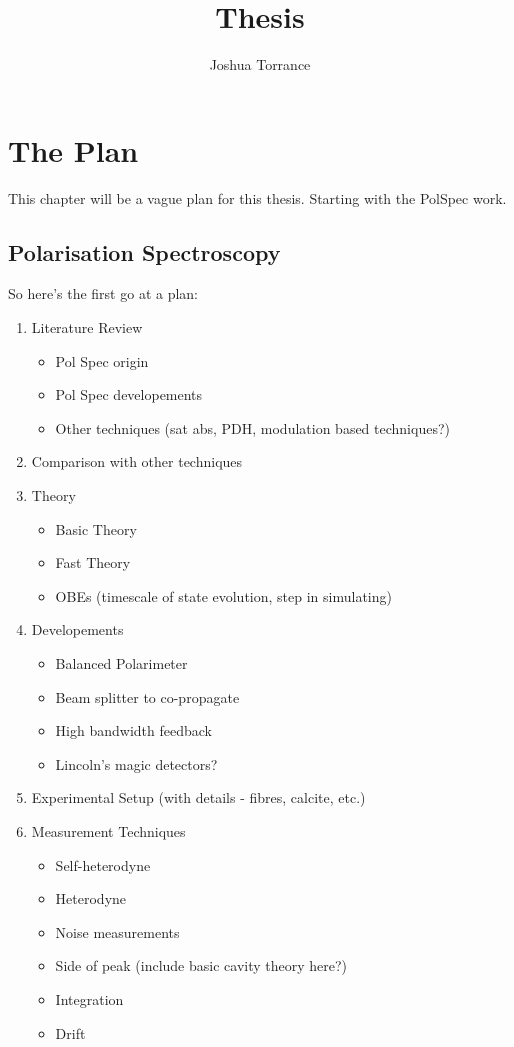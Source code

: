 \documentclass[11pt]{report}
\begin{document}
\title{Thesis}

\author{Joshua Torrance}

\maketitle

\chapter{The Plan}
This chapter will be a vague plan for this thesis. Starting with the PolSpec work.

\section{Polarisation Spectroscopy}
So here's the first go at a plan:
\begin{enumerate}
    \item Literature Review
    \begin{itemize}
        \item Pol Spec origin
        \item Pol Spec developements
        \item Other techniques (sat abs, PDH, modulation based techniques?)
    \end{itemize}
    \item Comparison with other techniques
    \item Theory
    \begin{itemize}
        \item Basic Theory
        \item Fast Theory
        \item OBEs (timescale of state evolution, step in simulating)
    \end{itemize}
    \item Developements
    \begin{itemize}
        \item Balanced Polarimeter
        \item Beam splitter to co-propagate
        \item High bandwidth feedback
        \item Lincoln's magic detectors?
    \end{itemize}
    \item Experimental Setup (with details - fibres, calcite, etc.)
    \item Measurement Techniques
    \begin{itemize}
        \item Self-heterodyne
        \item Heterodyne
        \item Noise measurements
        \item Side of peak (include basic cavity theory here?)
        \item Integration
        \item Drift
    \end{itemize}
\end{enumerate}
\end{document}
